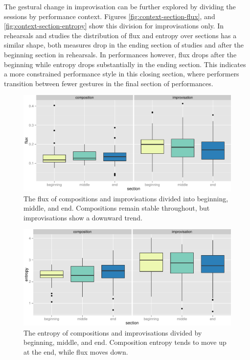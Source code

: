 \documentclass{sigchi}
\begin{document}
The gestural change in improvisation can be further explored by
dividing the sessions by performance context. Figures
\ref{fig:context-section-flux}, and \ref{fig:context-section-entropy} show
this division for improvisations only. In rehearsals and studies the
distribution of flux and entropy over sections has a similar shape,
both measures drop in the ending section of studies and after the
beginning section in rehearsals. In performances however, flux drops
after the beginning while entropy drops substantially in the ending
section. This indicates a more constrained performance style in this
closing section, where performers transition between fewer gestures in
the final section of performances.


\begin{figure}
  \centering
  \includegraphics[width=\linewidth]{figures/type-section-flux}
  \caption{The flux of compositions and improvisations divided into
    beginning, middle, and end. Compositions remain stable throughout,
    but improvisations show a downward trend.
    \label{fig:type-section-flux}}
\end{figure}

\begin{figure}
  \centering
  \includegraphics[width=\linewidth]{figures/type-section-entropy}
  \caption{The entropy of compositions and improvisations divided by
    beginning, middle, and end. Composition entropy tends to move up
    at the end, while flux moves down.
    \label{fig:type-section-entropy}}
\end{figure}
\end{document}
